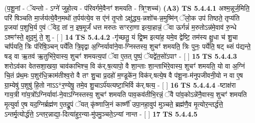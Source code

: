 \documentclass[17pt]{extarticle}
\begin{document}
                  \newline
                      (प॒शू॒नां - ॅयन्तो - ऽग्ने॑ जुहो॒त्य - प॑रिवर्गमे॒वैनꣳ॑ शमयति - त्रिꣳ॒॒शच्च॑)  \textbf{(A3)} \newline \newline
                                        \textbf{ TS 5.4.4.1} \newline
                  अश्म॒न्नूर्ज॒मिति॒ परि॑ षिञ्चति मा॒र्जय॑त्ये॒वैन॒मथो॑ त॒र्पय॑त्ये॒व स ए॑नं तृ॒प्तो ऽक्षु॑द्ध्य॒-न्नशो॑च-न्न॒मुष्मि॑न् ॅलो॒क उप॑ तिष्ठते॒ तृप्य॑ति प्र॒जया॑ प॒शुभि॒र्य ए॒वं ॅवेद॒ तां न॒ इष॒मूर्जं॑ धत्त मरुतः सꣳररा॒णा इत्या॒हान्नं॒ ॅवा ऊर्गन्नं॑ म॒रुतोऽन्न॑मे॒वाव॑ रु॒न्धे ऽश्मꣳ॑स्ते॒ क्षुद॒मुं ते॒ शु - [  ] \textbf{  14 } \newline
                  \newline
                                \textbf{ TS 5.4.4.2} \newline
                  -गृ॑च्छतु॒ यं द्वि॒ष्म इत्या॑ह॒ यमे॒व द्वेष्टि॒ तम॑स्य क्षु॒धा च॑ शु॒चा चा᳚र्पयति॒ त्रिः प॑रिषि॒ञ्चन् पर्ये॑ति त्रि॒वृद्वा अ॒ग्निर्यावा॑ने॒वा-ग्निस्तस्य॒ शुचꣳ॑ शमयति॒ त्रिः पुनः॒ पर्ये॑ति॒ षट् थ्सं प॑द्यन्ते॒ षड् वा ऋ॒तव॑ ऋ॒तुभि॑रे॒वास्य॒ शुचꣳ॑ शमयत्य॒पां ॅवा ए॒तत् पुष्पं॒ ॅयद्वे॑त॒सो॑ऽपाꣳ - [  ] \textbf{  15} \newline
                  \newline
                                \textbf{ TS 5.4.4.3} \newline
                  शरोऽव॑का वेतसशा॒खया॒ चाव॑काभिश्च॒ वि क॑र्.ष॒त्यापो॒ वै शा॒न्ताः शा॒न्ताभि॑रे॒वास्य॒ शुचꣳ॑ शमयति॒ यो वा अ॒ग्निं चि॒तं प्र॑थ॒मः प॒शुर॑धि॒क्राम॑तीश्व॒रो वै तꣳ शु॒चा प्र॒दहो॑ म॒ण्डूके॑न॒ विक॑र्.षत्ये॒ष वै प॑शू॒ना-म॑नुपजीवनी॒यो न वा ए॒ष ग्रा॒म्येषु॑ प॒शुषु॑ हि॒तो नाऽऽ*र॒ण्येषु॒ तमे॒व शु॒चाऽर्प॑यत्यष्टा॒भिर्वि क॑र्.षत्य॒ - [  ] \textbf{  16} \newline
                  \newline
                                \textbf{ TS 5.4.4.4} \newline
                  -ष्टाक्ष॑रा गाय॒त्री गा॑य॒त्रो᳚ऽग्निर्यावा॑-ने॒वाऽग्निस्तस्य॒ शुचꣳ॑ शमयति पाव॒कव॑तीभि॒रन्नं॒ ॅवै पा॑व॒कोऽन्ने॑नै॒वास्य॒ शुचꣳ॑ शमयति मृ॒त्युर्वा ए॒ष यद॒ग्निर्ब्रह्म॑ण ए॒तद्रू॒पं ॅयत् कृ॑ष्णाजि॒नं कार्ष्णी॑ उपा॒नहा॒वुप॑ मुञ्चते॒ ब्रह्म॑णै॒व मृ॒त्योर॒न्तर्द्ध॑त्ते॒ ऽन्तर्मृ॒त्योर्द्ध॑त्ते॒ ऽन्तर॒न्नाद्या॒-दित्या॑हुर॒न्या-मु॑पमु॒ञ्चते॒ऽन्यां नान्त - [  ] \textbf{  17} \newline
                  \newline
                                \textbf{ TS 5.4.4.5} \newline
\end{document}
